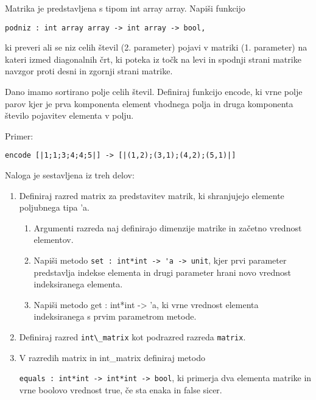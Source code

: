 \begin{ex}
Matrika je predstavljena s tipom int array array. Napi\v si funkcijo 
\begin{lstlisting}
podniz : int array array -> int array -> bool,
\end{lstlisting}
ki preveri ali se niz celih \v stevil (2. parameter) pojavi v matriki (1. parameter) na kateri izmed diagonalnih \v crt, ki poteka iz to\v ck na levi in spodnji strani matrike navzgor proti desni in zgornji strani matrike.


\end{ex} 
\begin{ex}
Dano imamo sortirano polje celih \v stevil. Definiraj funkcijo encode, ki vrne polje parov kjer je prva komponenta element vhodnega polja in druga komponenta \v stevilo pojavitev elementa v polju.   

Primer:
\begin{lstlisting}
encode [|1;1;3;4;4;5|] -> [|(1,2);(3,1);(4,2);(5,1)|]
\end{lstlisting}
\end{ex} 
\begin{ex} Naloga je sestavljena iz treh delov:
\begin{enumerate}
  \item  Definiraj razred matrix za predstavitev matrik, ki shranjujejo
  elemente poljubnega tipa 'a.
\begin{enumerate}
    \item Argumenti razreda naj definirajo dimenzije matrike in za\v cetno
  vrednost elementov.
  \item Napi\v si metodo 
  \lstinline{set : int*int -> 'a -> unit}, kjer prvi parameter
  predstavlja indekse elementa in drugi parameter hrani novo vrednost
  indeksiranega elementa.
  \item Napi\v si metodo get : int*int -> 'a, ki vrne vrednost elementa
  indeksiranega s prvim parametrom metode.
\end{enumerate}
       
  \item Definiraj razred \lstinline{int\_matrix} kot podrazred razreda \lstinline{matrix}.

  \item V razredih matrix in int\_matrix definiraj metodo 
  
\noindent  \lstinline{equals : int*int -> int*int -> bool},
    ki primerja dva elementa matrike in vrne
  boolovo vrednost true, \v ce sta enaka in false sicer.
\end{enumerate}


\end{ex} 
